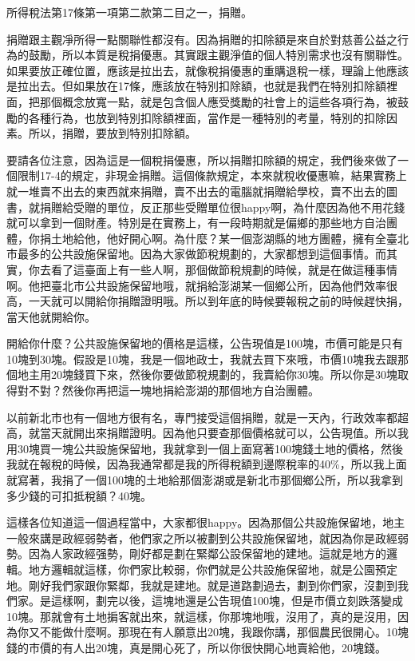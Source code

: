 \documentclass[oneside,sub3section]{ctexbook}
\begin{document}
所得稅法第17條第一項第二款第二目之一，捐贈。

捐贈跟主觀凈所得一點關聯性都沒有。因為捐贈的扣除額是來自於對慈善公益之行為的鼓勵，所以本質是稅捐優惠。其實跟主觀淨值的個人特別需求也沒有關聯性。如果要放正確位置，應該是拉出去，就像稅捐優惠的重購退稅一樣，理論上他應該是拉出去。但如果放在17條，應該放在特別扣除額，也就是我們在特別扣除額裡面，把那個概念放寬一點，就是包含個人應受獎勵的社會上的這些各項行為，被鼓勵的各種行為，也放到特別扣除額裡面，當作是一種特別的考量，特別的扣除因素。所以，捐贈，要放到特別扣除額。

要請各位注意，因為這是一個稅捐優惠，所以捐贈扣除額的規定，我們後來做了一個限制17-4的規定，非現金捐贈。這個條款規定，本來就稅收優惠嘛，結果實務上就一堆賣不出去的東西就來捐贈，賣不出去的電腦就捐贈給學校，賣不出去的圖書，就捐贈給受贈的單位，反正那些受贈單位很happy啊，為什麼因為他不用花錢就可以拿到一個財產。特別是在實務上，有一段時期就是偏鄉的那些地方自治團體，你捐土地給他，他好開心啊。為什麼？某一個澎湖縣的地方團體，擁有全臺北市最多的公共設施保留地。因為大家做節稅規劃的，大家都想到這個事情。而其實，你去看了這臺面上有一些人啊，那個做節稅規劃的時候，就是在做這種事情啊。他把臺北市公共設施保留地哦，就捐給澎湖某一個鄉公所，因為他們效率很高，一天就可以開給你捐贈證明哦。所以到年底的時候要報稅之前的時候趕快捐，當天他就開給你。

開給你什麼？公共設施保留地的價格是這樣，公告現值是100塊，市價可能是只有10塊到30塊。假設是10塊，我是一個地政士，我就去買下來哦，市價10塊我去跟那個地主用20塊錢買下來，然後你要做節稅規劃的，我賣給你30塊。所以你是30塊取得對不對？然後你再把這一塊地捐給澎湖的那個地方自治團體。

以前新北市也有一個地方很有名，專門接受這個捐贈，就是一天內，行政效率都超高，就當天就開出來捐贈證明。因為他只要查那個價格就可以，公告現值。所以我用30塊買一塊公共設施保留地，我就拿到一個上面寫著100塊錢土地的價格，然後我就在報稅的時候，因為我通常都是我的所得稅額到邊際稅率的40\%，所以我上面就寫著，我捐了一個100塊的土地給那個澎湖或是新北市那個鄉公所，所以我拿到多少錢的可扣抵稅額？40塊。

這樣各位知道這一個過程當中，大家都很happy。因為那個公共設施保留地，地主一般來講是政經弱勢者，他們家之所以被劃到公共設施保留地，就因為你是政經弱勢。因為人家政經强勢，剛好都是劃在緊鄰公設保留地的建地。這就是地方的邏輯。地方邏輯就這樣，你們家比較弱，你們就是公共設施保留地，就是公園預定地。剛好我們家跟你緊鄰，我就是建地。就是道路劃過去，劃到你們家，沒劃到我們家。是這樣啊，劃完以後，這塊地還是公告現值100塊，但是市價立刻跌落變成10塊。那就會有土地掮客就出來，就這樣，你那塊地哦，沒用了，真的是沒用，因為你又不能做什麼啊。那現在有人願意出20塊，我跟你講，那個農民很開心。10塊錢的市價的有人出20塊，真是開心死了，所以你很快開心地賣給他，20塊錢。
\end{document}
